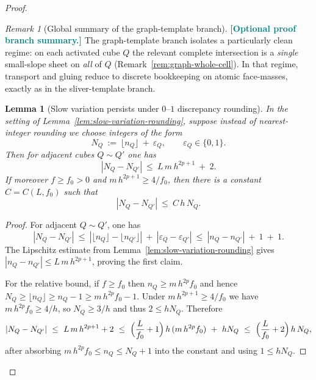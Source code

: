\documentclass[11pt]{article}
\newcommand{\REVMZ}[1]{\textcolor{teal}{#1}}  %
\numberwithin{equation}{section}  %
\theoremstyle{plain}
\newtheorem{lemma}[theorem]{Lemma}
\theoremstyle{definition}
\theoremstyle{remark}
\newtheorem{remark}[theorem]{Remark}
\begin{document}
\begin{proof}
%
\begin{remark}[Global summary of the graph-template branch]\label{rem:global-graph-summary}
\REVMZ{\textbf{[Optional proof branch summary.]}}
The graph-template branch isolates a particularly clean regime: on each activated cube $Q$ the relevant complete intersection is
a \emph{single} small-slope sheet on \emph{all} of $Q$ (Remark~\ref{rem:graph-whole-cell}).  In that regime, transport and gluing
reduce to discrete bookkeeping on atomic face-masses, exactly as in the sliver-template branch.

\end{remark}


\begin{lemma}[Slow variation persists under $0$--$1$ discrepancy rounding]\label{lem:slow-variation-discrepancy}
In the setting of Lemma~\ref{lem:slow-variation-rounding}, suppose instead of nearest-integer rounding we choose integers of the form
\[
N_Q\ :=\ \lfloor n_Q\rfloor\ +\ \varepsilon_Q,
\qquad \varepsilon_Q\in\{0,1\}.
\]
Then for adjacent cubes $Q\sim Q'$ one has
\[
|N_Q-N_{Q'}|\ \le\ L\,m\,h^{2p+1}\ +\ 2.
\]
If moreover $f\ge f_0>0$ and $m\,h^{2p+1}\ge 4/f_0$, then there is a constant $C=C(L,f_0)$ such that
\[
|N_Q-N_{Q'}|\ \le\ C\,h\,N_Q.
\]
\end{lemma}
\begin{proof}
For adjacent $Q\sim Q'$, one has
\[
|N_Q-N_{Q'}|
\ \le\ |\lfloor n_Q\rfloor-\lfloor n_{Q'}\rfloor|\ +\ |\varepsilon_Q-\varepsilon_{Q'}|
\ \le\ |n_Q-n_{Q'}|\ +\ 1\ +\ 1.
\]
The Lipschitz estimate from Lemma~\ref{lem:slow-variation-rounding} gives $|n_Q-n_{Q'}|\le L\,m\,h^{2p+1}$, proving the first claim.

For the relative bound, if $f\ge f_0$ then $n_Q\ge m\,h^{2p}f_0$ and hence
$N_Q\ge \lfloor n_Q\rfloor \ge n_Q-1 \ge m\,h^{2p}f_0-1$.
Under $m\,h^{2p+1}\ge 4/f_0$ we have $m\,h^{2p}f_0\ge 4/h$, so $N_Q\ge 3/h$ and thus $2\le hN_Q$.
Therefore
\[
|N_Q-N_{Q'}|
\ \le\ L\,m\,h^{2p+1}+2
\ \le\ \Bigl(\frac{L}{f_0}+1\Bigr)\,h\,(m\,h^{2p}f_0)\ +\ hN_Q
\ \le\ \Bigl(\frac{L}{f_0}+2\Bigr)\,h\,N_Q,
\]
after absorbing $m\,h^{2p}f_0\le n_Q\le N_Q+1$ into the constant and using $1\le hN_Q$.
\end{proof}


\end{proof}
\end{document}
